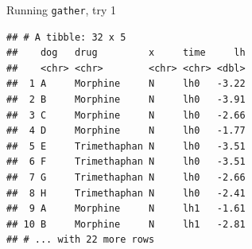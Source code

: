 \documentclass[
  ignorenonframetext,
]{beamer}
\newenvironment{Shaded}{\begin{snugshade}}{\end{snugshade}}
\newcommand{\KeywordTok}[1]{\textcolor[rgb]{0.13,0.29,0.53}{\textbf{#1}}}
\newcommand{\NormalTok}[1]{#1}
\newcommand{\OperatorTok}[1]{\textcolor[rgb]{0.81,0.36,0.00}{\textbf{#1}}}
\newcommand{\StringTok}[1]{\textcolor[rgb]{0.31,0.60,0.02}{#1}}
\begin{document}
\begin{frame}[fragile]{Running \texttt{gather}, try 1}
\protect\hypertarget{running-gather-try-1}{}

\footnotesize

\begin{Shaded}
\end{Shaded}

\begin{verbatim}
## # A tibble: 32 x 5
##    dog   drug         x     time     lh
##    <chr> <chr>        <chr> <chr> <dbl>
##  1 A     Morphine     N     lh0   -3.22
##  2 B     Morphine     N     lh0   -3.91
##  3 C     Morphine     N     lh0   -2.66
##  4 D     Morphine     N     lh0   -1.77
##  5 E     Trimethaphan N     lh0   -3.51
##  6 F     Trimethaphan N     lh0   -3.51
##  7 G     Trimethaphan N     lh0   -2.66
##  8 H     Trimethaphan N     lh0   -2.41
##  9 A     Morphine     N     lh1   -1.61
## 10 B     Morphine     N     lh1   -2.81
## # ... with 22 more rows
\end{verbatim}

\normalsize

\end{frame}
\end{document}

